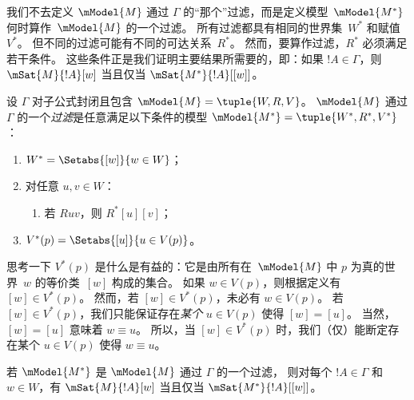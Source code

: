 \documentclass[../../../include/open-logic-section]{subfiles}
\begin{document}


我们不去定义 $\mModel{M}$ 通过 $\Gamma$ 的“那个”过滤，而是定义模型~$\mModel{M^*}$ 何时算作~$\mModel{M}$ 的一个过滤。
所有过滤都具有相同的世界集~$W^*$ 和赋值~$V^*$。
但不同的过滤可能有不同的可达关系~$R^*$。
然而，要算作过滤，$R^*$ 必须满足若干条件。
这些条件正是我们证明主要结果所需要的，即：如果 $!A \in \Gamma$，则 $\mSat{M}{!A}[w]$ 当且仅当 $\mSat{M^*}{!A}[{[w]}]$。

\begin{defn}
  设 $\Gamma$ 对子公式封闭且包含 $\mModel{M} = \tuple{W,
    R, V}$。
  $\mModel{M}$ 通过 $\Gamma$ 的一个\emph{过滤}是任意满足以下条件的模型 $\mModel{M^*} = \tuple{W^*,R^*,V^*}$：
  \begin{enumerate}
  \item $W^* = \Setabs{[w]}{w \in W}$；
  \item {}%
    对任意 $u,v \in W$：
    \begin{enumerate}
    \item {}%
      若 $Ruv$，则 $R^*[u][v]$；
    \end{enumerate}
  \item $V^*(p) = \Setabs{[u]}{u \in V(p)}$。
  \end{enumerate}
\end{defn}

思考一下 $V^*(p)$ 是什么是有益的：它是由所有在~$\mModel{M}$ 中 $p$ 为真的世界~$w$ 的等价类~$[w]$ 构成的集合。
如果 $w \in V(p)$，则根据定义有 $[w] \in V^*(p)$。
然而，若 $[w] \in V^*(p)$，未必有 $w \in V(p)$。
若 $[w] \in V^*(p)$，我们只能保证存在\emph{某个} $u \in V(p)$ 使得 $[w] = [u]$。
当然，$[w] = [u]$ 意味着 $w \equiv u$。
所以，当 $[w] \in V^*(p)$ 时，我们（仅）能断定存在某个 $u \in V(p)$ 使得 $w \equiv u$。

\begin{thm}
  若 $\mModel{M^*}$ 是 $\mModel{M}$ 通过 $\Gamma$ 的一个过滤，
  则对每个 $!A \in \Gamma$ 和 $w \in W$，有
  $\mSat{M}{!A}[w]$ 当且仅当 $\mSat{M^*}{!A}[{[w]}]$。
\end{thm}
\end{document}

